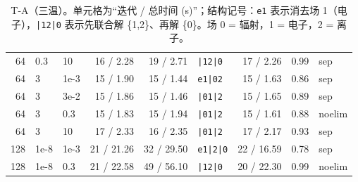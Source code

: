 \documentclass[11pt,a4paper]{ctexart}
\begin{document}
\begin{table}[H]
\begin{tabular}{rll rr l rr l}
64 & 0.3 & 10 & 16 / 2.28 & 19 / 2.71 & \texttt{|12|0} & 17 / 2.26 & 0.99 & sep \\
64 & 3 & 1e-3 & 15 / 1.90 & 15 / 1.44 & \texttt{e1|02} & 15 / 1.63 & 0.86 & sep \\
64 & 3 & 3e-2 & 15 / 1.86 & 15 / 1.46 & \texttt{|01|2} & 15 / 1.65 & 0.89 & sep \\
64 & 3 & 0.3 & 15 / 1.83 & 15 / 1.94 & \texttt{|01|2} & 15 / 1.61 & 0.88 & noelim \\
64 & 3 & 10 & 17 / 2.33 & 16 / 2.35 & \texttt{|01|2} & 17 / 2.17 & 0.93 & sep \\
128 & 1e-8 & 1e-3 & 21 / 21.26 & 32 / 29.50 & \texttt{e1|2|0} & 22 / 16.59 & 0.78 & sep \\
128 & 1e-8 & 0.3 & 21 / 22.58 & 49 / 56.10 & \texttt{|12|0} & 20 / 22.30 & 0.99 & noelim \\
\bottomrule
\end{tabular}
\caption{T-A（三温）。单元格为“迭代 / 总时间 (s)”；结构记号：\texttt{e1} 表示消去场 1（电子），\texttt{|12|0} 表示先联合解 \{1,2\}、再解 \{0\}。场 0 = 辐射，1 = 电子，2 = 离子。}
\end{table}
\end{document}
